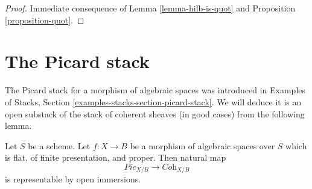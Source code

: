 \begin{proof}
Immediate consequence of
Lemma \ref{lemma-hilb-is-quot}
and Proposition \ref{proposition-quot}.
\end{proof}






\section{The Picard stack}
\label{section-picard-stack}

\noindent
The Picard stack for a morphism of algebraic spaces was introduced
in Examples of Stacks, Section \ref{examples-stacks-section-picard-stack}.
We will deduce it is an open substack of the stack of coherent sheaves
(in good cases) from the following lemma.

\begin{lemma}
\label{lemma-picard-stack-open-in-coh}
Let $S$ be a scheme. Let $f : X \to B$ be a morphism of algebraic spaces
over $S$ which is flat, of finite presentation, and proper.
Then natural map
$$
\textit{Pic}_{X/B} \longrightarrow \textit{Coh}_{X/B}
$$
is representable by open immersions.
\end{lemma}

